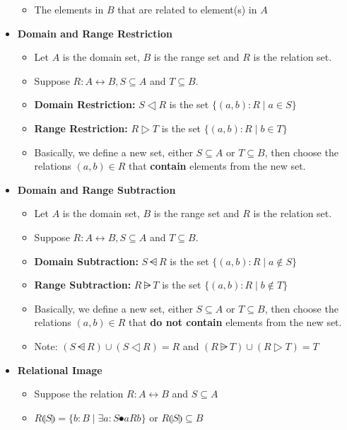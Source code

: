 \documentclass[10pt, landscape]{article}
\begin{document}
\begin{multicols*}{3}
\begin{center}
\begin{itemize}
\begin{itemize}
        \item The elements in $B$ that are related to element(s) in $A$
      \end{itemize}
      \item \textbf{Domain and Range Restriction}
      \begin{itemize}
        \item Let $A$ is the domain set, $B$ is the range set and $R$ is the relation set.
        \item Suppose $R: A \rel B, S \subseteq A$ and $T \subseteq B$.
        \item \textbf{Domain Restriction:} $S \dres R$ is the set $\{(a, b): R \mid a \in S\}$
        \item \textbf{Range Restriction:} $R \rres T$ is the set $\{(a, b): R \mid b \in T\}$
        \item Basically, we define a new set, either $S \subseteq A$ or $T \subseteq B$, then choose the relations $(a, b) \in R$ that \textbf{contain} elements from the new set. 
      \end{itemize}
      \item \textbf{Domain and Range Subtraction}
      \begin{itemize}
        \item Let $A$ is the domain set, $B$ is the range set and $R$ is the relation set.
        \item Suppose $R: A \rel B, S \subseteq A$ and $T \subseteq B$.
        \item \textbf{Domain Subtraction:} $S \ndres R$ is the set $\{(a, b): R \mid a \not \in S\}$
        \item \textbf{Range Subtraction:} $R \nrres T$ is the set $\{(a, b): R \mid b \not \in T\}$
        \item Basically, we define a new set, either $S \subseteq A$ or $T \subseteq B$, then choose the relations $(a, b) \in R$ that \textbf{do not contain} elements from the new set. 
        \item Note: $(S \ndres R) \cup (S \dres R) = R$ and $(R \nrres T) \cup (R \rres T) = T$
      \end{itemize}
      \item \textbf{Relational Image}
      \begin{itemize}
        \item Suppose the relation $R : A \rel B$ and $S \subseteq A$
        \item $R \limg S \rimg = \{b : B \mid \exists a : S \spot a R b\}$ or $R \limg S \rimg \subseteq B$

\end{itemize}
\end{itemize}
\end{center}
\end{multicols*}
\end{document}
